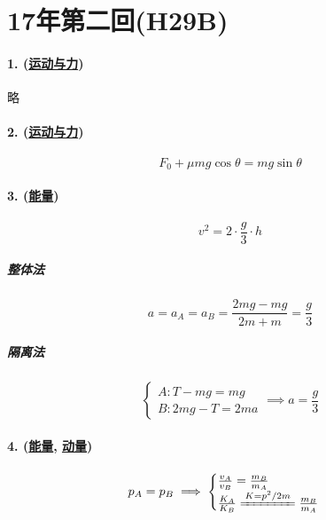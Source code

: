 
\section{17年第二回(H29B)}

\paragraph{1. (\hyperref[subsec:运动与力]{运动与力})} 略
\paragraph{2. (\hyperref[subsec:运动与力]{运动与力})}

\begin{equation*}
    F_0+\mu mg\cos\theta=mg\sin\theta
\end{equation*}

\paragraph{3. (\hyperref[subsec:能量]{能量})}

\begin{equation*}
    v^2=2\cdot\frac{g}{3}\cdot h
\end{equation*}

\subparagraph{整体法}

\begin{equation*}
    a=a_A=a_B=\frac{2mg-mg}{2m+m}=\frac{g}{3}
\end{equation*}

\subparagraph{隔离法}

\begin{equation*}
    \begin{cases}
        A: T-mg=mg\\
        B: 2mg-T=2ma
    \end{cases}\implies
    a=\frac{g}{3}
\end{equation*}

\paragraph{4. (\hyperref[subsec:能量]{能量}, \hyperref[subsec:动量]{动量})}

\begin{gather*}
    p_A=p_B\implies
    \begin{cases}
        \frac{v_A}{v_B}=\frac{m_B}{m_A}\\
        \frac{K_A}{K_B}\xlongequal{K=p^2/2m}\frac{m_B}{m_A}
    \end{cases}
\end{gather*}

